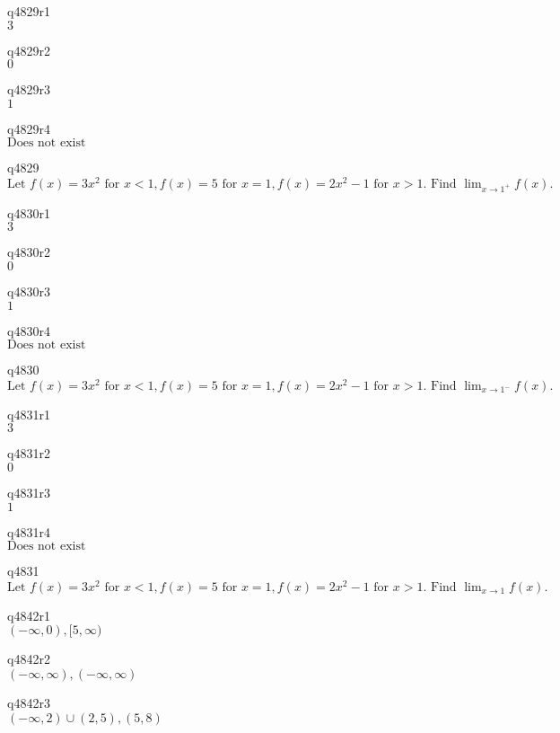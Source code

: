 q4829r1\\
\(\displaystyle 3 \)

q4829r2\\
\(\displaystyle 0 \)

q4829r3\\
\(\displaystyle 1 \)

q4829r4\\
\(\displaystyle \text{Does not exist} \)

q4829\\
\(\displaystyle \text{Let } f(x) = 3x^2 \text{ for } x < 1, f(x) = 5 \text{ for } x = 1, f(x) = 2x^2 - 1 \text{ for } x > 1. \text{ Find } \lim_{x \rightarrow 1^+} f(x). \)

q4830r1\\
\(\displaystyle 3 \)

q4830r2\\
\(\displaystyle 0 \)

q4830r3\\
\(\displaystyle 1 \)

q4830r4\\
\(\displaystyle \text{Does not exist} \)

q4830\\
\(\displaystyle \text{Let } f(x) = 3x^2 \text{ for } x < 1, f(x) = 5 \text{ for } x = 1, f(x) = 2x^2 - 1 \text{ for } x > 1. \text{ Find } \lim_{x \rightarrow 1^-} f(x). \)

q4831r1\\
\(\displaystyle 3 \)

q4831r2\\
\(\displaystyle 0 \)

q4831r3\\
\(\displaystyle 1 \)

q4831r4\\
\(\displaystyle \text{Does not exist} \)

q4831\\
\(\displaystyle \text{Let } f(x) = 3x^2 \text{ for } x < 1, f(x) = 5 \text{ for } x = 1, f(x) = 2x^2 - 1 \text{ for } x > 1. \text{ Find } \lim_{x \rightarrow 1} f(x). \)

q4842r1\\
\(\displaystyle (-\infty, 0), [5, \infty) \)

q4842r2\\
\(\displaystyle (-\infty, \infty), (-\infty, \infty) \)

q4842r3\\
\(\displaystyle (-\infty, 2) \cup (2, 5), (5, 8) \)

